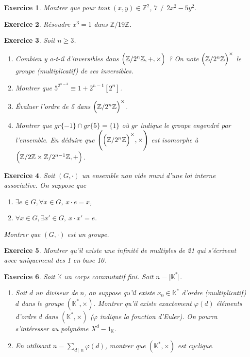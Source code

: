 \documentclass[12pt]{article}
\newtheorem{exercise}{Exercice}[section]
\theoremstyle{remark}
\theoremstyle{remark}
\newcommand{\K}{\mathbb{K}}
\newcommand{\Z}{\mathbb{Z}}
\begin{document}
\begin{exercise}
	Montrer que pour tout $(x,y)\in\Z^{2}$, $7\neq 2x^{2}-5y^{2}$.
\end{exercise}

\begin{exercise}
	Résoudre $x^{3}=1$ dans $\Z/19\Z$.
\end{exercise}

\begin{exercise}
	Soit $n\geqslant 3$.
	\begin{enumerate}
		\item Combien y a-t-il d'inversibles dans
		$\Bigl(\Z/2^{n}\Z,+,\times\Bigr)$ ? On note
		$\Bigl(\Z/2^{n}\Z\Bigr)^{\times}$ le groupe (multiplicatif) de ses
		inversibles.
		\item Montrer que $5^{2^{n-3}}\equiv 1+2^{n-1}[2^{n}]$.
		\item Évaluer l'ordre de 5 dans $\Bigl(\Z/2^{n}\Z\Bigr)^{\times}$.
		\item Montrer que $gr\{-1\}\cap gr\{5\}=\{1\}$ où $gr$ indique le groupe
		engendré par l'ensemble. En déduire que
		$\Biggl(\Bigl(\Z/2^{n}\Z\Bigr)^{\times},\times\Biggr)$ est isomorphe à $\Bigl(\Z/2\Z\times\Z/2^{n-1}\Z,+\Bigr)$.
	\end{enumerate}
\end{exercise}

\begin{exercise}
	Soit $(G,\cdot)$ un ensemble non vide muni d'une loi interne associative. On
	suppose que
	\begin{enumerate}
		\item [(i)] $\exists e\in G,\forall x\in G,~x\cdot e=x$,
		\item [(ii)] $\forall x\in G,\exists x'\in G,~x\cdot x'=e$.
	\end{enumerate}
	Montrer que $(G,\cdot)$ est un groupe.
\end{exercise}

\begin{exercise}
	Montrer qu'il existe une infinité de multiples de 21 qui s'écrivent avec
	uniquement des 1 en base 10.
\end{exercise}

\begin{exercise}
	Soit $\K$ un corps commutatif fini. Soit $n=\vert \K^{*}\vert$.
	\begin{enumerate}
		\item Soit $d$ un diviseur de  $n$, on suppose qu'il existe $x_{0}\in
		\K^{*}$ d'ordre (multiplicatif) $d$ dans le groupe $(\K^{*},\times)$.
		Montrer qu'il existe exactement $\varphi(d)$ éléments d'ordre $d$ dans
		$(\K^{*},\times)$ ($\varphi$ indique la fonction d'Euler). On pourra
		s'intéresser au polynôme $X^{d}-1_{\K}$.
		\item En utilisant $n=\sum_{d\mid n}\varphi(d)$, montrer que
		$(\K^{*},\times)$ est cyclique.
	\end{enumerate}
\end{exercise}
\end{document}
